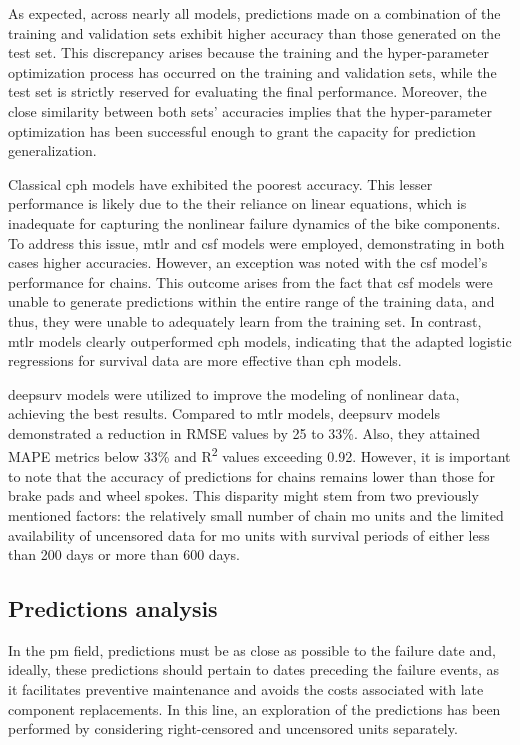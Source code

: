     As expected, across nearly all models, predictions made on a combination of the training and validation sets exhibit higher accuracy than those generated on the test set. This discrepancy arises because the training and the hyper-parameter optimization process has occurred on the training and validation sets, while the test set is strictly reserved for evaluating the final performance. Moreover, the close similarity between both sets' accuracies implies that the hyper-parameter optimization has been successful enough to grant the capacity for prediction generalization.

    Classical \ac{cph} models have exhibited the poorest accuracy. This lesser performance is likely due to the their reliance on linear equations, which is inadequate for capturing the nonlinear failure dynamics of the bike components. To address this issue, \ac{mtlr} and \ac{csf} models were employed, demonstrating in both cases higher accuracies. However, an exception was noted with the \ac{csf} model's performance for chains. This outcome arises from the fact that \ac{csf} models were unable to generate predictions within the entire range of the training data, and thus, they were unable to adequately learn from the training set. In contrast, \ac{mtlr} models clearly outperformed \ac{cph} models, indicating that the adapted logistic regressions for survival data are more effective than \ac{cph} models.

    \ac{deepsurv} models were utilized to improve the modeling of nonlinear data, achieving the best results. Compared to \ac{mtlr} models, \ac{deepsurv} models demonstrated a reduction in RMSE values by 25 to 33\%. Also, they attained MAPE metrics below 33\% and R\textsuperscript{2} values exceeding 0.92. However, it is important to note that the accuracy of predictions for chains remains lower than those for brake pads and wheel spokes. This disparity might stem from two previously mentioned factors: the relatively small number of chain \ac{mo} units and the limited availability of uncensored data for \ac{mo} units with survival periods of either less than 200 days or more than 600 days.

\subsection{Predictions analysis}

    In the \ac{pm} field, predictions must be as close as possible to the failure date and, ideally, these predictions should pertain to dates preceding the failure events, as it facilitates preventive maintenance and avoids the costs associated with late component replacements. In this line, an exploration of the predictions has been performed by considering right-censored and uncensored units separately.

